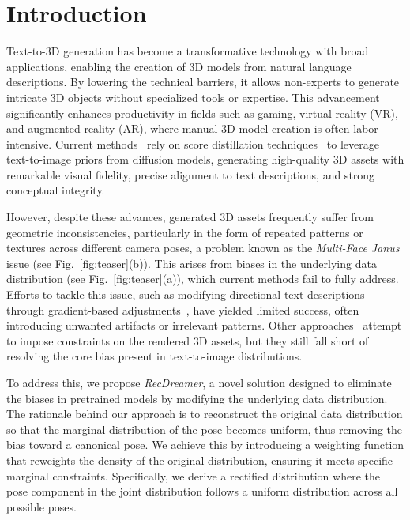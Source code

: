 \section{Introduction}



Text-to-3D generation has become a transformative technology with broad applications, enabling the creation of 3D models from natural language descriptions. By lowering the technical barriers, it allows non-experts to generate intricate 3D objects without specialized tools or expertise. This advancement significantly enhances productivity in fields such as gaming, virtual reality (VR), and augmented reality (AR), where manual 3D model creation is often labor-intensive. Current methods~\citep{wang2024prolificdreamer, chen2023fantasia3d, lin2023magic3d} rely on score distillation techniques~\citep{poole2022dreamfusion, wang2023score, graikos2022diffusion} to leverage text-to-image priors from diffusion models, generating high-quality 3D assets with remarkable visual fidelity, precise alignment to text descriptions, and strong conceptual integrity.

However, despite these advances, generated 3D assets frequently suffer from geometric inconsistencies, particularly in the form of repeated patterns or textures across different camera poses, a problem known as the \emph{Multi-Face Janus} issue (see Fig.~\ref{fig:teaser}(b)). This arises from biases in the underlying data distribution (see Fig.~\ref{fig:teaser}(a)), which current methods fail to fully address. Efforts to tackle this issue, such as modifying directional text descriptions through gradient-based adjustments~\citep{hong2023debiasing, armandpour2023re}, have yielded limited success, often introducing unwanted artifacts or irrelevant patterns. Other approaches~\citep{huang2024dreamcontrol, wang2024taming} attempt to impose constraints on the rendered 3D assets, but they still fall short of resolving the core bias present in text-to-image distributions.

To address this, we propose \emph{RecDreamer}, a novel solution designed to eliminate the biases in pretrained models by modifying the underlying data distribution. The rationale behind our approach is to reconstruct the original data distribution so that the marginal distribution of the pose becomes uniform, thus removing the bias toward a canonical pose. We achieve this by introducing a weighting function that reweights the density of the original distribution, ensuring it meets specific marginal constraints. Specifically, we derive a rectified distribution where the pose component in the joint distribution follows a uniform distribution across all possible poses.

